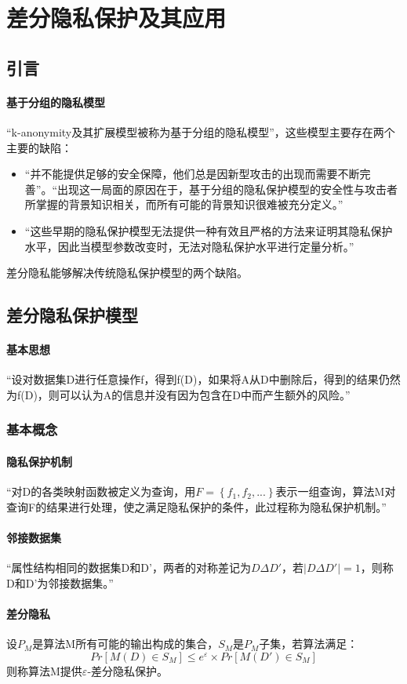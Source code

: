 \documentclass[12pt,a4paper]{article}
\begin{document}
\section{差分隐私保护及其应用\cite{熊平2014}}
\subsection{引言}
\paragraph{基于分组的隐私模型} “k-anonymity及其扩展模型被称为基于分组的隐私模型”，这些模型主要存在两个主要的缺陷：
\begin{itemize}
	\item “并不能提供足够的安全保障，他们总是因新型攻击的出现而需要不断完善”。“出现这一局面的原因在于，基于分组的隐私保护模型的安全性与攻击者所掌握的背景知识相关，而所有可能的背景知识很难被充分定义。”
	\item “这些早期的隐私保护模型无法提供一种有效且严格的方法来证明其隐私保护水平，因此当模型参数改变时，无法对隐私保护水平进行定量分析。”
\end{itemize}
差分隐私能够解决传统隐私保护模型的两个缺陷。
\subsection{差分隐私保护模型}
\paragraph{基本思想} “设对数据集D进行任意操作f，得到f(D)，如果将A从D中删除后，得到的结果仍然为f(D)，则可以认为A的信息并没有因为包含在D中而产生额外的风险。”

\subsubsection{基本概念}
\paragraph{隐私保护机制} “对D的各类映射函数被定义为查询，用$F=\left \{ f_1, f_2,... \right \}$表示一组查询，算法M对查询F的结果进行处理，使之满足隐私保护的条件，此过程称为隐私保护机制。”
\paragraph{邻接数据集} “属性结构相同的数据集D和D'，两者的对称差记为$D\Delta D'$，若$|D\Delta D'|=1$，则称D和D'为邻接数据集。”
\paragraph{差分隐私} 设$P_M$是算法M所有可能的输出构成的集合，$S_M$是$P_M$子集，若算法满足：
\begin{equation}
	Pr[M(D)\in S_M] \leq e^\varepsilon \times Pr[M(D')\in S_M]
\end{equation}
则称算法M提供$\varepsilon$-差分隐私保护。
\end{document}
